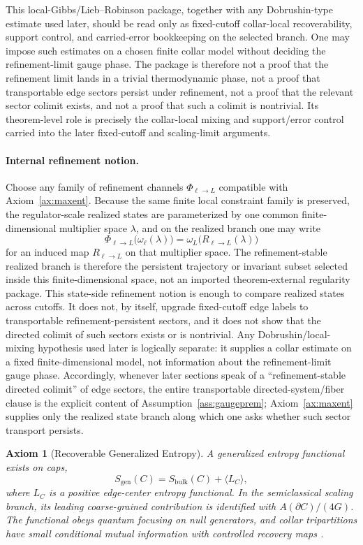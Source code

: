 \documentclass[11pt]{article}
\newtheorem{axiom}[theorem]{Axiom}
\begin{document}
This local-Gibbs/Lieb--Robinson package, together with any Dobrushin-type estimate used later, should be read only as fixed-cutoff collar-local recoverability, support control, and carried-error bookkeeping on the selected branch. One may impose such estimates on a chosen finite collar model without deciding the refinement-limit gauge phase. The package is therefore not a proof that the refinement limit lands in a trivial thermodynamic phase, not a proof that transportable edge sectors persist under refinement, not a proof that the relevant sector colimit exists, and not a proof that such a colimit is nontrivial. Its theorem-level role is precisely the collar-local mixing and support/error control carried into the later fixed-cutoff and scaling-limit arguments.

\paragraph{Internal refinement notion.}
Choose any family of refinement channels \(\Phi_{\ell\to L}\) compatible with Axiom~\ref{ax:maxent}. Because the same finite local constraint family is preserved, the regulator-scale realized states are parameterized by one common finite-dimensional multiplier space \(\lambda\), and on the realized branch one may write
\[
\Phi_{\ell\to L}\bigl(\omega_{\ell}(\lambda)\bigr)
=
\omega_{L}\!\bigl(R_{\ell\to L}(\lambda)\bigr)
\]
for an induced map \(R_{\ell\to L}\) on that multiplier space. The refinement-stable realized branch is therefore the persistent trajectory or invariant subset selected inside this finite-dimensional space, not an imported theorem-external regularity package. This state-side refinement notion is enough to compare realized states across cutoffs. It does not, by itself, upgrade fixed-cutoff edge labels to transportable refinement-persistent sectors, and it does not show that the directed colimit of such sectors exists or is nontrivial. Any Dobrushin/local-mixing hypothesis used later is logically separate: it supplies a collar estimate on a fixed finite-dimensional model, not information about the refinement-limit gauge phase. Accordingly, whenever later sections speak of a ``refinement-stable directed colimit'' of edge sectors, the entire transportable directed-system/fiber clause is the explicit content of Assumption~\ref{ass:gaugeprem}; Axiom~\ref{ax:maxent} supplies only the realized state branch along which one asks whether such sector transport persists.

\begin{axiom}[Recoverable Generalized Entropy]\label{ax:entropy}
A generalized entropy functional exists on caps,
\[
S_{\mathrm{gen}}(C)=S_{\mathrm{bulk}}(C)+\langle L_C\rangle,
\]
where \(L_C\) is a positive edge-center entropy functional. In the semiclassical scaling branch, its leading coarse-grained contribution is identified with \(A(\partial C)/(4G)\). The functional obeys quantum focusing on null generators, and collar tripartitions have small conditional mutual information with controlled recovery maps \cite{liebRuskai73,petz86,petz88,fawziRenner15}.
\end{axiom}
\end{document}

